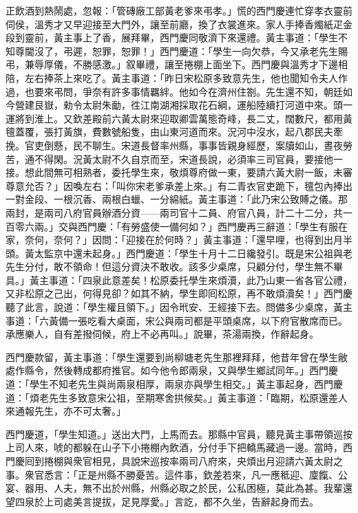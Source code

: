 正飲酒到熱鬧處，忽報：「管磚廠工部黃老爹來弔孝。」慌的西門慶連忙穿孝衣靈前伺侯，溫秀才又早迎接至大門外，讓至前廳，換了衣裳進來。家人手捧香燭紙疋金段到靈前，黃主事上了香，展拜畢，西門慶同敬濟下來還禮。黃主事道：「學生不知尊閫沒了，弔遲，恕罪，恕罪！」西門慶道：「學生一向欠恭，今又承老先生賜弔，兼辱厚儀，不勝感激。」叙畢禮，讓至捲棚上面坐下。西門慶與溫秀才下邊相陪，左右捧茶上來吃了。黃主事道：「昨日宋松原多致意先生，他也聞知令夫人作過，也要來弔問，爭奈有許多事情羈絆。他如今在濟州住劄。先生還不知，朝廷如今營建艮嶽，勑令太尉朱勔，徃江南湖湘採取花石綱，運船陸續打河道中來。頭一運將到淮上。又欽差殿前六黃太尉來迎取卿雲萬態奇峰，長二丈，闊數尺，都用黃氊蓋覆，張打黃旗，費數號船隻，由山東河道而來。況河中沒水，起八郡民夫牽挽。官吏倒懸，民不聊生。{}宋道長督率州縣，事事皆親身經歷，案牘如山，晝夜勞苦，通不得閑。況黃太尉不久自京而至，宋道長說，必須率三司官員，要接他一接。想此間無可相熟者，委托學生來，敬煩尊府做一東，要請六黃大尉一飯，未審尊意允否？」因喚左右：「叫你宋老爹承差上來。」有二青衣官吏跪下，氊包內捧出一對金段、一根沉香、兩根白蠟、一分綿紙。黃主事道：「此乃宋公致賻之儀。那兩封，是兩司八府官員辦酒分資——兩司官十二員、府官八員，計二十二分，共一百零六兩。」交與西門慶：「有勞盛使一備何如？」西門慶再三辭道：「學生有服在家，奈何，奈何？」因問：「迎接在於何時？」黃主事道：「還早哩，也得到出月半頭。黃太監京中還未起身。」西門慶道：「學生十月十二日纔發引。既是宋公祖與老先生分付，敢不領命！但這分資決不敢收。該多少桌席，只顧分付，學生無不畢具。」黃主事道：「四泉此意差矣！松原委托學生來煩瀆，此乃山東一省各官公禮，又非松原之己出，何得見卻？如其不納，學生即囘松原，再不敢煩瀆矣！」{}西門慶聽了此言，說道：「學生權且領下。」因令玳安、王經接下去。問備多少桌席，黃主事道：「六黃備一張吃看大桌面，宋公與兩司都是平頭桌席，以下府官散席而已。承應樂人，自有差撥伺候，府上不必再叫。」說畢，茶湯兩換，作辭起身。

西門慶款留，黃主事道：「學生還要到尚柳塘老先生那裡拜拜，他昔年曾在學生敝處作縣令，然後轉成都府推官。如今他令郎兩泉，又與學生鄉試同年。」{}西門慶道：「學生不知老先生與尚兩泉相厚，兩泉亦與學生相交。」黃主事起身，西門慶道：「煩老先生多致意宋公祖，至期寒舍拱候矣。」黃主事道：「臨期，松原還差人來通報先生，亦不可太奢。」

西門慶道，「學生知道。」送出大門，上馬而去。那縣中官員，聽見黃主事帶領巡按上司人來，唬的都躲在山子下小捲棚內飲酒，分付手下把轎馬藏過一邊。{}當時，西門慶囘到捲棚與衆官相見，具說宋巡按率兩司八府來，央煩出月迎請六黃太尉之事。衆官悉言：「正是州縣不勝憂苦。這件事，欽差若來，凡一應秪迎、廩餼、公宴、器用、人夫，無不出於州縣，州縣必取之於民，公私困極，莫此為甚。我輩還望四泉於上司處美言提拔，足見厚愛。」言訖，都不久坐，告辭起身而去。

